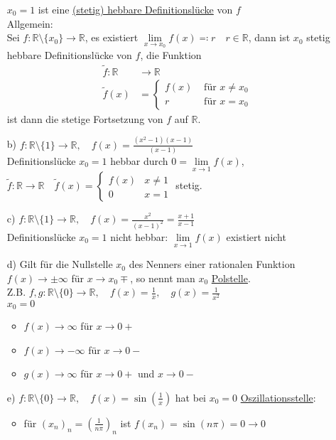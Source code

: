 \documentclass[12pt, titlepage]{article}
\newcommand{\R}{\mathds{R}}
\renewcommand{\>}{\rightarrow}
\renewcommand{\*}{\cdot}
\begin{document}
\begin{itemize}
		$x_0=1$ ist eine \underline{(stetig) hebbare Definitionslücke} von $f$\\
		Allgemein:\\
		Sei $f\colon\R\setminus\{x_0\}\>\R$, es existiert $\lim\limits_{x\> x_0}f(x)\eqqcolon r\quad r\in\R$, dann ist $x_0$ stetig hebbare Definitionslücke von $f$, die Funktion
		\begin{align*}
			\tilde{f}\colon \R&\>\R\\
			\tilde{f}(x)&=\begin{cases}f(x)&\textrm{ für }x\neq x_0\\
			r&\textrm{ für }x=x_0
			\end{cases}
		\end{align*}
		ist dann die stetige Fortsetzung von $f$ auf $\R$.
		\item[b)] $f\colon\R\setminus\{1\}\>\R,\quad f(x)=\frac{(x^2-1)(x-1)}{(x-1)}$\\
		Definitionslücke $x_0=1$ hebbar durch $0=\lim\limits_{x\>1}f(x)$,\\
		$\tilde{f}\colon\R\>\R\quad\tilde{f}(x)=\begin{cases}f(x)&x\neq 1\\0&x=1
		\end{cases}$ stetig.
		\item[c)] $f\colon\R\setminus\{1\}\>\R,\quad f(x)=\frac{x^2}{(x-1)^2}=\frac{x+1}{x-1}$\\
		Definitionslücke $x_0=1$ nicht hebbar: $\lim\limits_{x\>1}f(x)$ existiert nicht
		\item[d)] Gilt für die Nullstelle $x_0$ des Nenners einer rationalen Funktion $f(x)\>\pm\infty$ für $x\> x_0\mp$, so nennt man $x_0$ \underline{Polstelle}.\\
		Z.B. $f,g\colon\R\setminus\{0\}\>\R,\quad f(x)=\frac{1}{x},\quad g(x)=\frac{1}{x^2}$\\
		$x_0=0$\\
		\begin{itemize}
			\item $f(x)\>\infty$ für $x\>0+$
			\item $f(x)\>-\infty$ für $x\>0-$
			\item $g(x)\>\infty$ für $x\>0+$ und $x\>0-$
		\end{itemize}
		\item[e)] $f\colon\R\setminus\{0\}\>\R,\quad f(x)=\sin(\frac{1}{x})$ hat bei $x_0=0$ \underline{Oszillationsstelle}:
		\begin{itemize}
			\item für $(x_n)_n=(\frac{1}{n\pi})_n$ ist $f(x_n)=\sin(n\pi)=0\>0$

\end{itemize}
\end{itemize}
\end{document}
